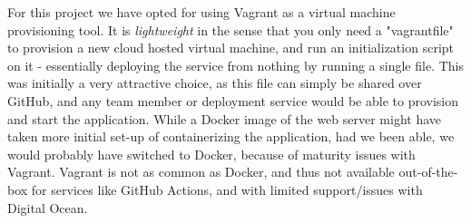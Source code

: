 For this project we have opted for using Vagrant as a virtual machine provisioning tool. It is \textit{lightweight} in the sense that you only need a "vagrantfile" to provision a new cloud hosted virtual machine, and run an initialization script on it - essentially deploying the service from nothing by running a single file. This was initially a very attractive choice, as this file can simply be shared over GitHub, and any team member or deployment service would be able to provision and start the application. While a Docker image of the web server might have taken more initial set-up of containerizing the application, had we been able, we would probably have switched to Docker, because of maturity issues with Vagrant. Vagrant is not as common as Docker, and thus not available out-of-the-box for services like GitHub Actions, and with limited support/issues with Digital Ocean.

